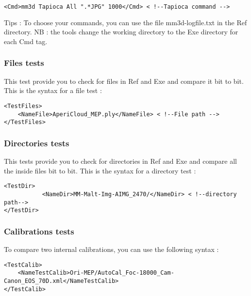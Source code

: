 \documentclass[a4paper]{book}
\begin{document}
\begin{lstlisting}
<Cmd>mm3d Tapioca All ".*JPG" 1000</Cmd> < !--Tapioca command -->
\end{lstlisting}

Tips : To choose your commands, you can use the file mm3d-logfile.txt in the Ref directory.
NB : the tools change the working directory to the Exe directory for each Cmd tag.

\subsubsection{Files tests}
This test provide you to check for files in Ref and Exe and compare it bit to bit. This is the syntax for a file test :

\begin{lstlisting}
<TestFiles> 
	<NameFile>AperiCloud_MEP.ply</NameFile> < !--File path --> 
</TestFiles>
\end{lstlisting}

\subsubsection{Directories tests}
This tests provide you to check for directories in Ref and Exe and compare all the inside files bit to bit. This is the syntax for a directory test :

\begin{lstlisting}
<TestDir> 
           <NameDir>MM-Malt-Img-AIMG_2470/</NameDir> < !--directory path-->
</TestDir>
\end{lstlisting}

\subsubsection{Calibrations tests}
To compare two internal calibrations, you can use the following syntax :

\begin{lstlisting}
<TestCalib> 
	<NameTestCalib>Ori-MEP/AutoCal_Foc-18000_Cam-Canon_EOS_70D.xml</NameTestCalib> 
</TestCalib>
\end{lstlisting}
\end{document}
